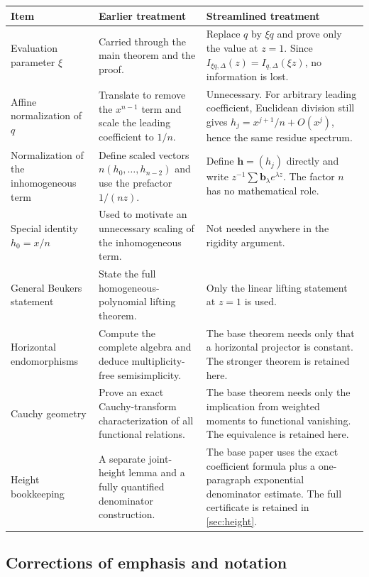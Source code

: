 \documentclass[11pt]{article}
\numberwithin{equation}{section}
\theoremstyle{definition}
\theoremstyle{remark}
\begin{document}
\begin{longtable}{>{\raggedright\arraybackslash}p{}>{\raggedright\arraybackslash}p{}>{\raggedright\arraybackslash}p{}}
\toprule
Item & Earlier treatment & Streamlined treatment \\
\midrule
\endhead
Evaluation parameter $\xi$ & Carried through the main theorem and the proof. &
Replace $q$ by $\xi q$ and prove only the value at $z=1$.  Since
$I_{\xi q,\Delta}(z)=I_{q,\Delta}(\xi z)$, no information is lost. \\
\addlinespace
Affine normalization of $q$ & Translate to remove the $x^{n-1}$ term and
scale the leading coefficient to $1/n$. & Unnecessary.  For arbitrary
leading coefficient, Euclidean division still gives
$h_j=x^{j+1}/n+O(x^j)$, hence the same residue spectrum. \\
\addlinespace
Normalization of the inhomogeneous term & Define scaled vectors
$n(h_0,\ldots,h_{n-2})$ and use the prefactor $1/(nz)$. & Define
$\mathbf h=(h_j)$ directly and
write $z^{-1}\sum\mathbf b_\lambda e^{\lambda z}$.  The factor $n$ has no
mathematical role. \\
\addlinespace
Special identity $h_0=x/n$ & Used to motivate an unnecessary scaling of the inhomogeneous term. &
Not needed anywhere in the rigidity argument. \\
\addlinespace
General Beukers statement & State the full homogeneous-polynomial lifting
theorem. & Only the linear lifting statement at $z=1$ is used. \\
\addlinespace
Horizontal endomorphisms & Compute the complete algebra and deduce
multiplicity-free semisimplicity. & The base theorem needs only that a
horizontal projector is constant.  The stronger theorem is retained here. \\
\addlinespace
Cauchy geometry & Prove an exact Cauchy-transform characterization of all
functional relations. & The base theorem needs only the implication from
weighted moments to functional vanishing.  The equivalence is retained
here. \\
\addlinespace
Height bookkeeping & A separate joint-height lemma and a fully quantified
denominator construction. & The base paper uses the exact coefficient formula
plus a one-paragraph exponential denominator estimate.  The full certificate
is retained in \cref{sec:height}. \\
\bottomrule
\end{longtable}

\subsection{Corrections of emphasis and notation}
\end{document}

